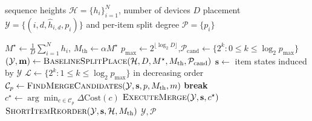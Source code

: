 \begin{algorithm}
    \caption{FlexUlysses Placement Algorithm}
    \label{alg:placement}
    \begin{algorithmic}[1]
    \Require sequence heights $\mathcal{H}=\{h_i\}_{i=1}^N$, number of devices $D$
    \Ensure placement $\mathcal{Y}=\{(i,d,\hat h_{i,d},p_i)\}$ and per-item split degree $\mathcal{P}=\{p_i\}$

    \State $M^\star \gets \frac{1}{D}\sum_{i=1}^N h_i$, \quad $M_{\mathrm{th}}\gets \alpha M^\star$ 
    \State $p_{\max}\gets 2^{\lfloor \log_2 D \rfloor}$,\quad $\mathcal{P}_{\mathrm{cand}}\gets\{2^k:0\le k\le \log_2 p_{\max}\}$
    \State $(\mathcal{Y}, \mathbf{m}) \gets \Call{BaselineSplitPlace}{\mathcal{H},D,M^\star,M_{\mathrm{th}},\mathcal{P}_{\mathrm{cand}}}$
    \State $\mathbf{s}\gets$ item states induced by $\mathcal{Y}$ 
    \State $\mathcal{L}\gets \{2^k:1\le k\le \log_2 p_{\max}\}$ in decreasing order
        \State $\mathcal{C}_p \gets \Call{FindMergeCandidates}{\mathcal{Y},\mathbf{s},p,M_{\mathrm{th}},m}$ 
         \State \textbf{break} \EndIf
        \State $c^\star \gets \arg\min_{c\in\mathcal{C}_p}\Delta\mathrm{Cost}(c)$
        \State $\Call{ExecuteMerge}{\mathcal{Y},\mathbf{s},c^\star}$
    \EndWhile
    \EndFor
    \State $\Call{ShortItemReorder}{\mathcal{Y},\mathbf{s},\mathcal{H},M_{\mathrm{th}}}$
    \State \Return $\mathcal{Y}, \mathcal{P}$
    \end{algorithmic}
\end{algorithm}

